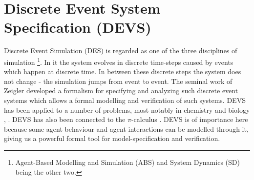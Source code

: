 \section{Discrete Event System Specification (DEVS)}
Discrete Event Simulation (DES) is regarded as one of the three disciplines of simulation \footnote{Agent-Based Modelling and Simulation (ABS) and System Dynamics (SD) being the other two.}. In it the system evolves in discrete time-steps caused by events which happen at discrete time. In between these discrete steps the system does not change - the simulation jumps from event to event. The seminal work of Zeigler \cite{zeigler_theory_2000} developed a formalism for specifying and analyzing such discrete event systems which allows a formal modelling and verification of such systems. DEVS has been applied to a number of problems, most notably in chemistry and biology \cite{ewald_discrete_2007}, \cite{uhrmacher_discrete_2005}. DEVS has also been connected to the $\pi$-calculus \cite{wang_pi-calculus_2008}.
DEVS is of importance here because some agent-behaviour and agent-interactions can be modelled through it, giving us a powerful formal tool for model-specification and verification.